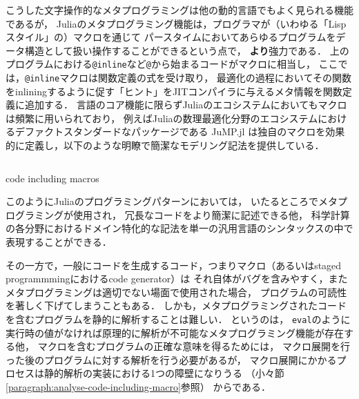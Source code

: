 \inputminted[frame=lines, firstline=3, lastline=12, breaklines]{julia}{src/sums_def.jl}

こうした文字操作的なメタプログラミングは他の動的言語でもよく見られる機能であるが，
Juliaのメタプログラミング機能は，プログラマが（いわゆる「Lispスタイル」の）マクロを通じて
パースタイムにおいてあらゆるプログラムをデータ構造として扱い操作することができるという点で，
\textbf{より}強力である．
上のプログラムにおける\verb|@inline|など\verb|@|から始まるコードがマクロに相当し，
ここでは，\verb|@inline|マクロは関数定義の式を受け取り，
最適化の過程においてその関数をinliningするように促す「ヒント」をJITコンパイラに与えるメタ情報を関数定義に追加する．
言語のコア機能に限らずJuliaのエコシステムにおいてもマクロは頻繁に用いられており，
例えばJuliaの数理最適化分野のエコシステムにおけるデファクトスタンダードなパッケージである
JuMP.jl\cite{DunningHuchetteLubin2017}
は独自のマクロを効果的に定義し，以下のような明瞭で簡潔なモデリング記法を提供している．

\begin{listing}[ht]
  \inputminted[frame=lines, linenos, firstnumber=1, firstline=4, lastline=10]{julia}{src/jump.jl}
  \caption{code including macros}
  \label{lst:target2}
\end{listing}

このようにJuliaのプログラミングパターンにおいては，
いたるところでメタプログラミングが使用され\footnotemark，
冗長なコードをより簡潔に記述できる他，
科学計算の各分野におけるドメイン特化的な記法を単一の汎用言語のシンタックスの中で表現することができる\cite{jeff-phd}．


その一方で，一般にコードを生成するコード，つまりマクロ（あるいはstaged programmmingにおけるcode generator）は
それ自体がバグを含みやすく，またメタプログラミングは適切でない場面で使用された場合，
プログラムの可読性を著しく下げてしまうこともある．
しかも，メタプログラミングされたコードを含むプログラムを静的に解析することは難しい．
というのは，
\verb|eval|のように実行時の値がなければ原理的に解析が不可能なメタプログラミング機能が存在する他，
マクロを含むプログラムの正確な意味を得るためには，
マクロ展開を行った後のプログラムに対する解析を行う必要があるが，
マクロ展開にかかるプロセスは静的解析の実装における1つの障壁になりうる
（小々節\ref{paragraph:analyse-code-including-macro}参照）
からである．

